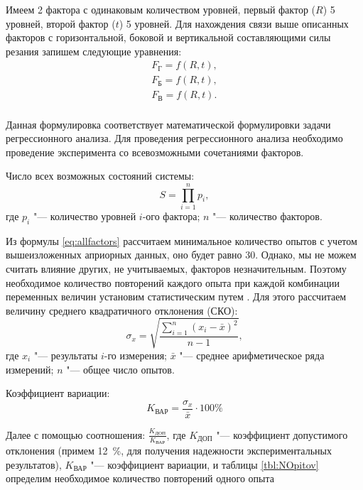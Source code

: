 Имеем 2 фактора с одинаковым количеством уровней, первый фактор ($R$) 5 уровней, второй фактор ($t$) 5 уровней. Для нахождения связи выше описанных факторов с горизонтальной, боковой и вертикальной составляющими силы резания запишем следующие уравнения:
\begin{equation}
\label{eq:regresF}
\begin{alignedat}{2}
	F_\text{Г}=f(R,t),\\
	F_\text{Б}=f(R,t),\\
	F_\text{В}=f(R,t).\\
\end{alignedat}
\end{equation}

Данная формулировка соответствует математической формулировки задачи регрессионного анализа. Для проведения регрессионного анализа необходимо проведение эксперимента со всевозможными сочетаниями факторов.

Число всех возможных состояний системы:
\begin{equation}
\label{eq:allfactors}
S=\prod_{i=1}^n p_i,
\end{equation}
где $ p_i $ "--- количество уровней $i$-ого фактора; 
	$ n $ "--- количество факторов.
	
Из формулы \ref{eq:allfactors} рассчитаем минимальное количество опытов с учетом вышеизложенных априорных данных, оно будет равно 30. Однако, мы не можем считать влияние других, не учитываемых, факторов незначительным. Поэтому необходимое количество повторений каждого опыта при каждой комбинации переменных величин установим статистическим путем \cite{Zelenin}. Для этого рассчитаем величину среднего квадратичного отклонения (СКО):
\begin{equation}
\label{eq:sigma_x}
\sigma_x=\sqrt{\frac{\sum_{i=1}^n (x_i-\bar{x})^2}{n-1}},
\end{equation}
где $ x_i $ "--- результаты $ i $-го измерения;
	$ \bar{x} $ "--- среднее арифметическое ряда измерений;
	$ n $ "--- общее число опытов.

Коэффициент вариации:
\begin{equation}
\label{eq:var}
K_{\text{ВАР}}=\frac{\sigma_x}{\bar{x}}\cdot100\%
\end{equation}

Далее с помощью соотношения: $ \frac{K_{\text{ДОП}}}{K_{\text{ВАР}}} $, где $ K_{\text{ДОП}} $ "--- коэффициент допустимого отклонения (примем 12~\%, для получения надежности экспериментальных результатов), $ K_{\text{ВАР}} $ "--- коэффициент вариации, и таблицы \ref{tbl:NOpitov} определим необходимое количество повторений одного опыта



